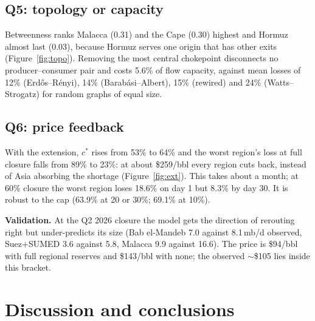 \documentclass[11pt,a4paper]{article}
\begin{document}
\subsection{Q5: topology or capacity}

Betweenness ranks Malacca (0.31) and the Cape (0.30) highest and Hormuz almost last (0.03), because Hormuz serves one origin that has other exits (Figure~\ref{fig:topo}). Removing the most central chokepoint disconnects no producer--consumer pair and costs 5.6\% of flow capacity, against mean losses of 12\% (Erdős--Rényi), 14\% (Barabási--Albert), 15\% (rewired) and 24\% (Watts--Strogatz) for random graphs of equal size.

\subsection{Q6: price feedback}

With the extension, $c^{*}$ rises from 53\% to 64\% and the worst region's loss at full closure falls from 89\% to 23\%: at about \$259/bbl every region cuts back, instead of Asia absorbing the shortage (Figure~\ref{fig:ext}). This takes about a month; at 60\% closure the worst region loses 18.6\% on day 1 but 8.3\% by day 30. It is robust to the cap (63.9\% at 20 or 30\%; 69.1\% at 10\%).

\textbf{Validation.} At the Q2 2026 closure the model gets the direction of rerouting right but under-predicts its size (Bab el-Mandeb 7.0 against 8.1\,mb/d observed, Suez+SUMED 3.6 against 5.8, Malacca 9.9 against 16.6). The price is \$94/bbl with full regional reserves and \$143/bbl with none; the observed $\sim$\$105 lies inside this bracket.


\section{Discussion and conclusions}
\end{document}
